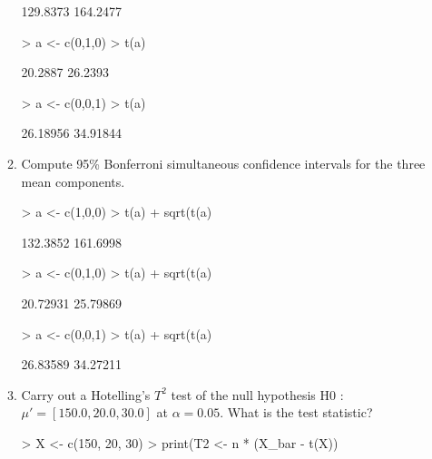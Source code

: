 \documentclass[12pt,a4paper]{paper}
\begin{document}
\begin{enumerate}
\begin{enumerate}
\begin{Schunk}
\begin{Soutput}
[1] 129.8373 164.2477
\end{Soutput}
\begin{Sinput}
> a <- c(0,1,0)
> t(a) %
\end{Sinput}
\begin{Soutput}
[1] 20.2887 26.2393
\end{Soutput}
\begin{Sinput}
> a <- c(0,0,1)
> t(a) %
\end{Sinput}
\begin{Soutput}
[1] 26.18956 34.91844
\end{Soutput}
\end{Schunk}
\item Compute 95\% Bonferroni simultaneous confidence intervals for the three mean components.
\begin{Schunk}
\begin{Sinput}
> a <- c(1,0,0)
> t(a) %
+   sqrt(t(a) %
\end{Sinput}
\begin{Soutput}
[1] 132.3852 161.6998
\end{Soutput}
\begin{Sinput}
> a <- c(0,1,0)
> t(a) %
+   sqrt(t(a) %
\end{Sinput}
\begin{Soutput}
[1] 20.72931 25.79869
\end{Soutput}
\begin{Sinput}
> a <- c(0,0,1)
> t(a) %
+   sqrt(t(a) %
\end{Sinput}
\begin{Soutput}
[1] 26.83589 34.27211
\end{Soutput}
\end{Schunk}
\item Carry out a Hotelling's $T^{2}$ test of the null hypothesis H0 : $\mu' = \left[150.0,20.0,30.0\right]$ at $\alpha = 0.05$. What is the test statistic?
\begin{Schunk}
\begin{Sinput}
> X <- c(150, 20, 30)
> print(T2 <- n * (X_bar - t(X)) %
\end{Sinput}
\begin{Soutput}

\end{Soutput}
\end{Schunk}
\end{enumerate}
\end{enumerate}
\end{document}
